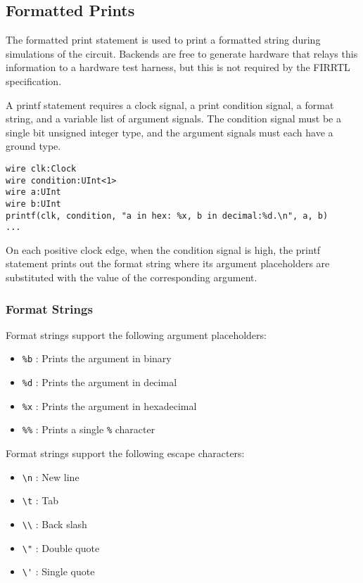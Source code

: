 \documentclass[12pt]{article}
\begin{document}
\subsection{Formatted Prints}
The formatted print statement is used to print a formatted string during simulations of the circuit. Backends are free to generate hardware that relays this information to a hardware test harness, but this is not required by the FIRRTL specification.

A printf statement requires a clock signal, a print condition signal, a format string, and a variable list of argument signals. The condition signal must be a single bit unsigned integer type, and the argument signals must each have a ground type.

\begin{verbatim}
wire clk:Clock
wire condition:UInt<1>
wire a:UInt
wire b:UInt
printf(clk, condition, "a in hex: %x, b in decimal:%d.\n", a, b)
...
\end{verbatim}

On each positive clock edge, when the condition signal is high, the printf statement prints out the format string where its argument placeholders are substituted with the value of the corresponding argument.

\subsubsection{Format Strings}

Format strings support the following argument placeholders:
\begin{itemize}
\item \verb|%b| : Prints the argument in binary
\item \verb|%d| : Prints the argument in decimal
\item \verb|%x| : Prints the argument in hexadecimal
\item \verb|%%| : Prints a single \verb|%| character
\end{itemize}

Format strings support the following escape characters:
\begin{itemize}
\item \verb|\n| : New line
\item \verb|\t| : Tab
\item \verb|\\| : Back slash
\item \verb|\"| : Double quote
\item \verb|\'| : Single quote
\end{itemize}
\end{document}

